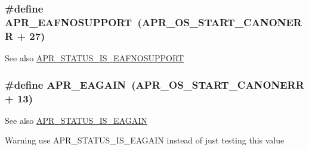 \subsubsection[{\texorpdfstring{A\+P\+R\+\_\+\+E\+A\+F\+N\+O\+S\+U\+P\+P\+O\+RT}{APR_EAFNOSUPPORT}}]{\setlength{\rightskip}{0pt plus 5cm}\#define A\+P\+R\+\_\+\+E\+A\+F\+N\+O\+S\+U\+P\+P\+O\+RT~({\bf A\+P\+R\+\_\+\+O\+S\+\_\+\+S\+T\+A\+R\+T\+\_\+\+C\+A\+N\+O\+N\+E\+RR} + 27)}\hypertarget{group___a_p_r___error_ga76b558840838bcb94a4811a8e52df7a6}{}\label{group___a_p_r___error_ga76b558840838bcb94a4811a8e52df7a6}
\begin{DoxySeeAlso}{See also}
\hyperlink{group___a_p_r___s_t_a_t_u_s___i_s_gafe99a5411377be6f2a8ea21196d7cb5d}{A\+P\+R\+\_\+\+S\+T\+A\+T\+U\+S\+\_\+\+I\+S\+\_\+\+E\+A\+F\+N\+O\+S\+U\+P\+P\+O\+RT} 
\end{DoxySeeAlso}
\subsubsection[{\texorpdfstring{A\+P\+R\+\_\+\+E\+A\+G\+A\+IN}{APR_EAGAIN}}]{\setlength{\rightskip}{0pt plus 5cm}\#define A\+P\+R\+\_\+\+E\+A\+G\+A\+IN~({\bf A\+P\+R\+\_\+\+O\+S\+\_\+\+S\+T\+A\+R\+T\+\_\+\+C\+A\+N\+O\+N\+E\+RR} + 13)}\hypertarget{group___a_p_r___error_ga0b2a5ebb819de5ce93d326939b586578}{}\label{group___a_p_r___error_ga0b2a5ebb819de5ce93d326939b586578}
\begin{DoxySeeAlso}{See also}
\hyperlink{group___a_p_r___s_t_a_t_u_s___i_s_ga56aa0a70756b5e83bc9d90f920527be4}{A\+P\+R\+\_\+\+S\+T\+A\+T\+U\+S\+\_\+\+I\+S\+\_\+\+E\+A\+G\+A\+IN} 
\end{DoxySeeAlso}
\begin{DoxyWarning}{Warning}
use A\+P\+R\+\_\+\+S\+T\+A\+T\+U\+S\+\_\+\+I\+S\+\_\+\+E\+A\+G\+A\+IN instead of just testing this value 
\end{DoxyWarning}
